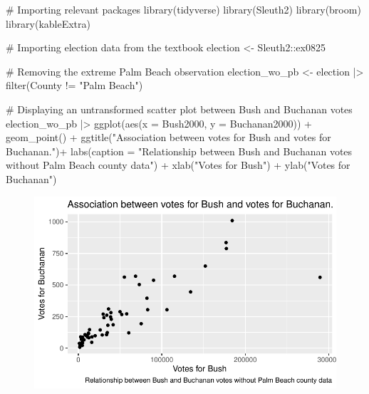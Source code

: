 \documentclass[
  letterpaper,
  DIV=11,
  numbers=noendperiod]{scrartcl}
\newenvironment{Shaded}{\begin{snugshade}}{\end{snugshade}}
\newcommand{\AttributeTok}[1]{\textcolor[rgb]{0.40,0.45,0.13}{#1}}
\newcommand{\CommentTok}[1]{\textcolor[rgb]{0.37,0.37,0.37}{#1}}
\newcommand{\FunctionTok}[1]{\textcolor[rgb]{0.28,0.35,0.67}{#1}}
\newcommand{\NormalTok}[1]{\textcolor[rgb]{0.00,0.23,0.31}{#1}}
\newcommand{\OtherTok}[1]{\textcolor[rgb]{0.00,0.23,0.31}{#1}}
\newcommand{\SpecialCharTok}[1]{\textcolor[rgb]{0.37,0.37,0.37}{#1}}
\newcommand{\StringTok}[1]{\textcolor[rgb]{0.13,0.47,0.30}{#1}}
\begin{document}
\begin{Shaded}
\begin{Highlighting}[]
\CommentTok{\# Importing relevant packages}
\FunctionTok{library}\NormalTok{(tidyverse)}
\FunctionTok{library}\NormalTok{(Sleuth2)}
\FunctionTok{library}\NormalTok{(broom)}
\FunctionTok{library}\NormalTok{(kableExtra) }

\CommentTok{\# Importing election data from the textbook}
\NormalTok{election }\OtherTok{\textless{}{-}}\NormalTok{ Sleuth2}\SpecialCharTok{::}\NormalTok{ex0825}

\CommentTok{\# Removing the extreme Palm Beach observation}
\NormalTok{election\_wo\_pb }\OtherTok{\textless{}{-}}\NormalTok{ election }\SpecialCharTok{|\textgreater{}} \FunctionTok{filter}\NormalTok{(County }\SpecialCharTok{!=} \StringTok{"Palm Beach"}\NormalTok{)}

\CommentTok{\# Displaying an untransformed scatter plot between Bush and Buchanan votes}
\NormalTok{election\_wo\_pb }\SpecialCharTok{|\textgreater{}} \FunctionTok{ggplot}\NormalTok{(}\FunctionTok{aes}\NormalTok{(}\AttributeTok{x =}\NormalTok{ Bush2000, }\AttributeTok{y =}\NormalTok{ Buchanan2000)) }\SpecialCharTok{+} \FunctionTok{geom\_point}\NormalTok{() }\SpecialCharTok{+} \FunctionTok{ggtitle}\NormalTok{(}\StringTok{"Association between votes for Bush and votes for Buchanan."}\NormalTok{)}\SpecialCharTok{+} \FunctionTok{labs}\NormalTok{(}\AttributeTok{caption =} \StringTok{"Relationship between Bush and Buchanan votes without Palm Beach county data"}\NormalTok{) }\SpecialCharTok{+} \FunctionTok{xlab}\NormalTok{(}\StringTok{"Votes for Bush"}\NormalTok{) }\SpecialCharTok{+} \FunctionTok{ylab}\NormalTok{(}\StringTok{"Votes for Buchanan"}\NormalTok{)}
\end{Highlighting}
\end{Shaded}

\begin{figure}[H]

{\centering \includegraphics{case_study_1_files/figure-pdf/unnamed-chunk-6-1.pdf}

}

\end{figure}
\end{document}
